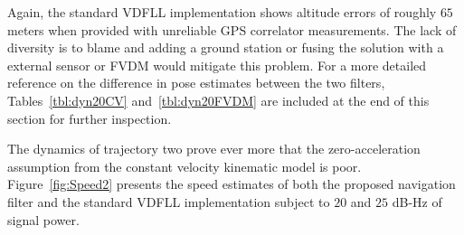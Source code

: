 Again, the standard VDFLL implementation shows altitude errors of roughly \(65\) meters when provided with unreliable GPS correlator measurements. The lack of diversity is to blame and adding a ground station or fusing the solution with a external sensor or FVDM would mitigate this problem. For a more detailed reference on the difference in pose estimates between the two filters, Tables~\ref{tbl:dyn20CV} and~\ref{tbl:dyn20FVDM} are included at the end of this section for further inspection.

The dynamics of trajectory two prove ever more that the zero-acceleration assumption from the constant velocity kinematic model is poor. Figure~\ref{fig:Speed2} presents the speed estimates of both the proposed navigation filter and the standard VDFLL implementation subject to \(20\) and \(25\) dB-Hz of signal power.

